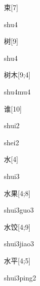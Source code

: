 \begin{verbete}[shu4]{束}[7]
\begin{pronuncia}{shu4}
\end{pronuncia}
\end{verbete}

\begin{verbete}[shu4]{树}[9]
\begin{pronuncia}{shu4}
\end{pronuncia}
\end{verbete}

\begin{verbete}[shu4mu4]{树木}[9;4]
\begin{pronuncia}{shu4mu4}
\end{pronuncia}
\end{verbete}

\begin{verbete}[shui2]{谁}[10]
\begin{pronuncia}{shui2}
\end{pronuncia}
\begin{pronuncia}{shei2}
\end{pronuncia}
\end{verbete}

\begin{verbete}[shui3]{水}[4]
\begin{pronuncia}{shui3}
\end{pronuncia}
\end{verbete}

\begin{verbete}{水果}[4;8]
\begin{pronuncia}{shui3guo3}
\end{pronuncia}
\end{verbete}

\begin{verbete}{水饺}[4;9]
\begin{pronuncia}{shui3jiao3}
\end{pronuncia}
\end{verbete}

\begin{verbete}{水平}[4;5]
\begin{pronuncia}{shui3ping2}
\end{pronuncia}
\end{verbete}

